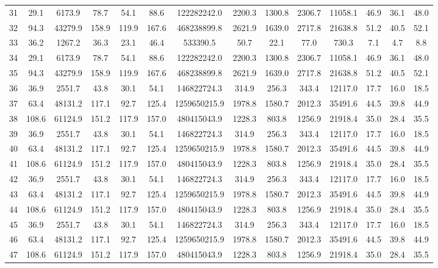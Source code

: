 \begin{table}[htbp]
\begin{tabular}{|c|c|c|c|c|c|c|c|c|c|c|c|c|c|}
31 &  29.1 &  6173.9 &  78.7 &  54.1 &  88.6 &  122282242.0 & 2200.3 & 1300.8 & 2306.7 & 11058.1 & 46.9 & 36.1 & 48.0 \\
32 &  94.3 & 43279.9 & 158.9 & 119.9 & 167.6 &  468238899.8 & 2621.9 & 1639.0 & 2717.8 & 21638.8 & 51.2 & 40.5 & 52.1 \\
33 &  36.2 &  1267.2 &  36.3 &  23.1 &  46.4 &     533390.5 &   50.7 &   22.1 &   77.0 &   730.3 &  7.1 &  4.7 &  8.8 \\
34 &  29.1 &  6173.9 &  78.7 &  54.1 &  88.6 &  122282242.0 & 2200.3 & 1300.8 & 2306.7 & 11058.1 & 46.9 & 36.1 & 48.0 \\
35 &  94.3 & 43279.9 & 158.9 & 119.9 & 167.6 &  468238899.8 & 2621.9 & 1639.0 & 2717.8 & 21638.8 & 51.2 & 40.5 & 52.1 \\
36 &  36.9 &  2551.7 &  43.8 &  30.1 &  54.1 &  146822724.3 &  314.9 &  256.3 &  343.4 & 12117.0 & 17.7 & 16.0 & 18.5 \\
37 &  63.4 & 48131.2 & 117.1 &  92.7 & 125.4 & 1259650215.9 & 1978.8 & 1580.7 & 2012.3 & 35491.6 & 44.5 & 39.8 & 44.9 \\
38 & 108.6 & 61124.9 & 151.2 & 117.9 & 157.0 &  480415043.9 & 1228.3 &  803.8 & 1256.9 & 21918.4 & 35.0 & 28.4 & 35.5 \\
39 &  36.9 &  2551.7 &  43.8 &  30.1 &  54.1 &  146822724.3 &  314.9 &  256.3 &  343.4 & 12117.0 & 17.7 & 16.0 & 18.5 \\
40 &  63.4 & 48131.2 & 117.1 &  92.7 & 125.4 & 1259650215.9 & 1978.8 & 1580.7 & 2012.3 & 35491.6 & 44.5 & 39.8 & 44.9 \\
41 & 108.6 & 61124.9 & 151.2 & 117.9 & 157.0 &  480415043.9 & 1228.3 &  803.8 & 1256.9 & 21918.4 & 35.0 & 28.4 & 35.5 \\
42 &  36.9 &  2551.7 &  43.8 &  30.1 &  54.1 &  146822724.3 &  314.9 &  256.3 &  343.4 & 12117.0 & 17.7 & 16.0 & 18.5 \\
43 &  63.4 & 48131.2 & 117.1 &  92.7 & 125.4 & 1259650215.9 & 1978.8 & 1580.7 & 2012.3 & 35491.6 & 44.5 & 39.8 & 44.9 \\
44 & 108.6 & 61124.9 & 151.2 & 117.9 & 157.0 &  480415043.9 & 1228.3 &  803.8 & 1256.9 & 21918.4 & 35.0 & 28.4 & 35.5 \\
45 &  36.9 &  2551.7 &  43.8 &  30.1 &  54.1 &  146822724.3 &  314.9 &  256.3 &  343.4 & 12117.0 & 17.7 & 16.0 & 18.5 \\
46 &  63.4 & 48131.2 & 117.1 &  92.7 & 125.4 & 1259650215.9 & 1978.8 & 1580.7 & 2012.3 & 35491.6 & 44.5 & 39.8 & 44.9 \\
47 & 108.6 & 61124.9 & 151.2 & 117.9 & 157.0 &  480415043.9 & 1228.3 &  803.8 & 1256.9 & 21918.4 & 35.0 & 28.4 & 35.5 \\

\end{tabular}
\end{table}
